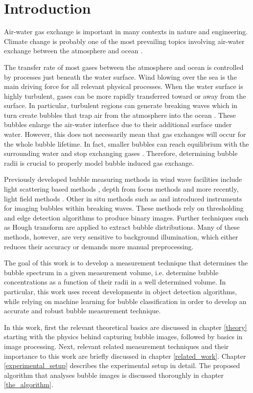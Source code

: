 \chapter{Introduction}
	Air-water gas exchange is important in many contexts in nature and engineering. Climate change is probably one of the most prevailing topics involving air-water exchange between the atmosphere and ocean \citep{NIWA}.
	
	The transfer rate of most gases between the atmosphere and ocean is controlled by processes just beneath the water surface. Wind blowing over the sea is the main driving force for all relevant physical processes. 
	When the water surface is highly turbulent, gases can be more rapidly transferred toward or away from the surface. In particular, turbulent regions can generate breaking waves which in turn create bubbles that trap air from the atmosphere into the ocean \citep{Terry}. These bubbles enlarge the air-water interface due to their additional surface under water. However, this does not necessarily mean that gas exchanges will occur for the whole bubble lifetime. In fact, smaller bubbles can reach equilibrium with the surrounding water and stop exchanging gases \citep{MischlerDiss}. Therefore, determining bubble radii is crucial to properly model bubble induced gas exchange.
	
	Previously developed bubble measuring methods in wind wave facilities include light scattering based methods \citep{jaehne1984}, depth from focus methods \citep{geissler_1995} and more recently, light field methods \citep{MischlerDiss}. Other in situ methods such as \citet{Al-Lashi2016} and \citet{Leifer2003} introduced instruments for imaging bubbles within breaking waves. These methods rely on thresholding and edge detection algorithms to produce binary images. Further techniques such as Hough transform \citep{Hough1972} are applied to extract bubble distributions. Many of these methods, however, are very sensitive to background illumination, which either reduces their accuracy \citep{Zhong2016} or demands more manual preprocessing.  
	
	The goal of this work is to develop a measurement technique that determines the bubble spectrum in a given measurement volume, i.e. determine bubble concentrations as a function of their radii in a well determined volume. In particular, this work uses recent developments in object detection algorithms, while relying on machine learning for bubble classification in order to develop an accurate and robust bubble measurement technique. 
	
	In this work, first the relevant theoretical basics are discussed in chapter \ref{theory} starting with the physics behind capturing bubble images, followed by basics in image processing. Next, relevant related measurement techniques and their importance to this work are briefly discussed in chapter \ref{related_work}. Chapter \ref{experimental_setup} describes the experimental setup in detail. The proposed algorithm that analyses bubble images is discussed thoroughly in chapter \ref{the_algorithm}. 